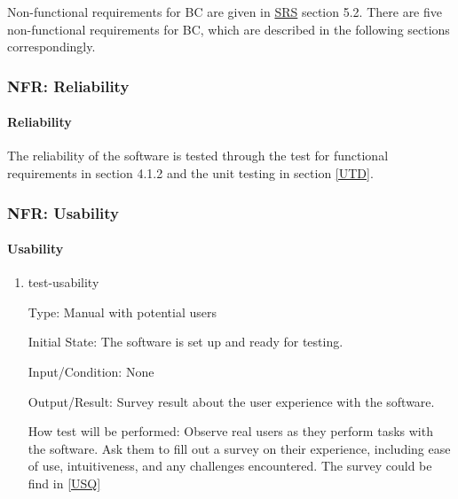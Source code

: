 \documentclass[12pt, titlepage]{article}
\begin{document}
Non-functional requirements for BC are given in \href{https://github.com/CynthiaLiu0805/BridgeCorrosion/blob/main/docs/SRS/SRS.pdf}{SRS} section 5.2. There are five non-functional requirements for BC, which are described in the following sections correspondingly.



\subsubsection{NFR: Reliability}\label{t_reliability}
		
\paragraph{Reliability}

The reliability of the software is tested through the test for functional requirements in section 4.1.2 and the unit testing in section \ref{UTD}.					

\subsubsection{NFR: Usability}\label{t_usability}
		
\paragraph{Usability}

\begin{enumerate}

\item{test-usability}

Type: Manual with potential users
					
Initial State: The software is set up and ready for testing.
					
Input/Condition: None
					
Output/Result: Survey result about the user experience with the software.
					
How test will be performed: Observe real users as they perform tasks with the software. Ask them to fill out a survey on their experience, including ease of use, intuitiveness, and any challenges encountered. The survey could be find in \ref{USQ}
\end{enumerate}
\end{document}
